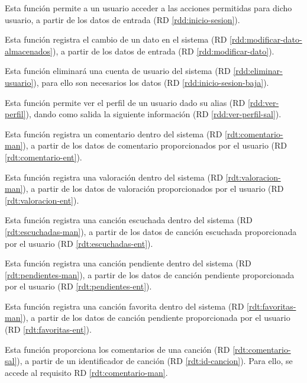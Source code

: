 Esta función permite a un usuario acceder a las acciones permitidas para dicho usuario, a partir de los datos de entrada (RD \ref{rdd:inicio-sesion}).

Esta función registra el cambio de un dato en el sistema (RD \ref{rdd:modificar-dato-almacenados}), a partir de los datos de entrada (RD \ref{rdd:modificar-dato}).

Esta función eliminará una cuenta de usuario del sistema (RD \ref{rdd:eliminar-usuario}), para ello son necesarios los datos (RD \ref{rdd:inicio-sesion-baja}).

Esta función permite ver el perfil de un usuario dado su alias (RD \ref{rdd:ver-perfil}), dando como salida la siguiente información (RD \ref{rdd:ver-perfil-sal}).

Esta función registra un comentario dentro del sistema (RD \ref{rdt:comentario-man}), a partir de los datos de comentario proporcionados por el usuario (RD \ref{rdt:comentario-ent}).

Esta función registra una valoración dentro del sistema (RD \ref{rdt:valoracion-man}), a partir de los datos de valoración proporcionados por el usuario (RD \ref{rdt:valoracion-ent}).

Esta función registra una canción escuchada dentro del sistema (RD \ref{rdt:escuchadas-man}), a partir de los datos de canción escuchada proporcionada por el usuario (RD \ref{rdt:escuchadas-ent}).

Esta función registra una canción pendiente dentro del sistema (RD \ref{rdt:pendientes-man}), a partir de los datos de canción pendiente proporcionada por el usuario (RD \ref{rdt:pendientes-ent}).

Esta función registra una canción favorita dentro del sistema (RD \ref{rdt:favoritas-man}), a partir de los datos de canción pendiente proporcionada por el usuario (RD \ref{rdt:favoritas-ent}).

Esta función proporciona los comentarios de una canción (RD \ref{rdt:comentario-sal}), a partir de un identificador de canción (RD \ref{rdt:id-cancion}). Para ello, se accede al requisito RD \ref{rdt:comentario-man}.

